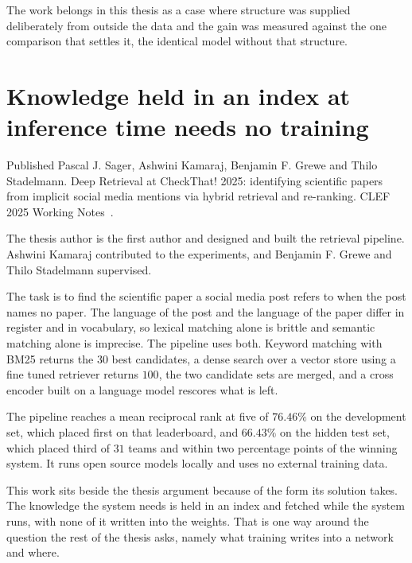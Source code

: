 The work belongs in this thesis as a case where structure was supplied
deliberately from outside the data and the gain was measured against the one
comparison that settles it, the identical model without that structure.

\section{Knowledge held in an index at inference time needs no training}
\label{sec:retrieval}

\begin{publicationbasis}{Published}
Pascal J. Sager, Ashwini Kamaraj, Benjamin F. Grewe and Thilo Stadelmann.
Deep Retrieval at CheckThat! 2025: identifying scientific papers from implicit
social media mentions via hybrid retrieval and re-ranking. CLEF 2025 Working
Notes~\cite{sager_deep_2025}.
\end{publicationbasis}

The thesis author is the first author and designed and built the retrieval
pipeline. Ashwini Kamaraj contributed to the experiments, and Benjamin F.
Grewe and Thilo Stadelmann supervised.

The task is to find the scientific paper a social media post refers to when
the post names no paper. The language of the post and the language of the
paper differ in register and in vocabulary, so lexical matching alone is
brittle and semantic matching alone is imprecise. The pipeline uses both.
Keyword matching with BM25 returns the $30$ best candidates, a dense search
over a vector store using a fine tuned retriever returns $100$, the two
candidate sets are merged, and a cross encoder built on a language model
rescores what is left.

The pipeline reaches a mean reciprocal rank at five of $76.46\%$ on the
development set, which placed first on that leaderboard, and $66.43\%$ on the
hidden test set, which placed third of $31$ teams and within two percentage
points of the winning system. It runs open source models locally and uses no
external training data.

This work sits beside the thesis argument because of the form its solution
takes. The knowledge the system needs is held in an index and fetched while
the system runs, with none of it written into the weights. That is one way
around the question the rest of the thesis asks, namely what training writes
into a network and where.
